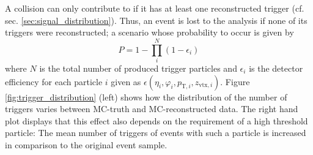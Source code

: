 A collision can only contribute to \Y if it has at least one reconstructed trigger (cf. sec. \ref{sec:signal_distribution}). Thus, an event is lost to the analysis if none of its triggers were reconstructed; a scenario whose probability to occur is given by
\begin{equation}
  \label{eq:prob_one_trigger}
  P = 1 - \prod_{i}^{N}(1- \epsilon_i)
\end{equation}
where $N$ is the total number of produced trigger particles and $\epsilon_i$ is the detector efficiency for each particle $i$ given as $\epsilon(\eta_i, \varphi_i, p_{\text{T},i}, z_{\text{vtx},i})$. Figure \ref{fig:trigger_distribution} (left) shows how the distribution of the number of triggers varies between MC-truth and MC-reconstructed data. The right hand plot displays that this effect also depends on the requirement of a high \pt threshold particle: The mean number of triggers of events with such a particle is increased in comparison to the original event sample.
